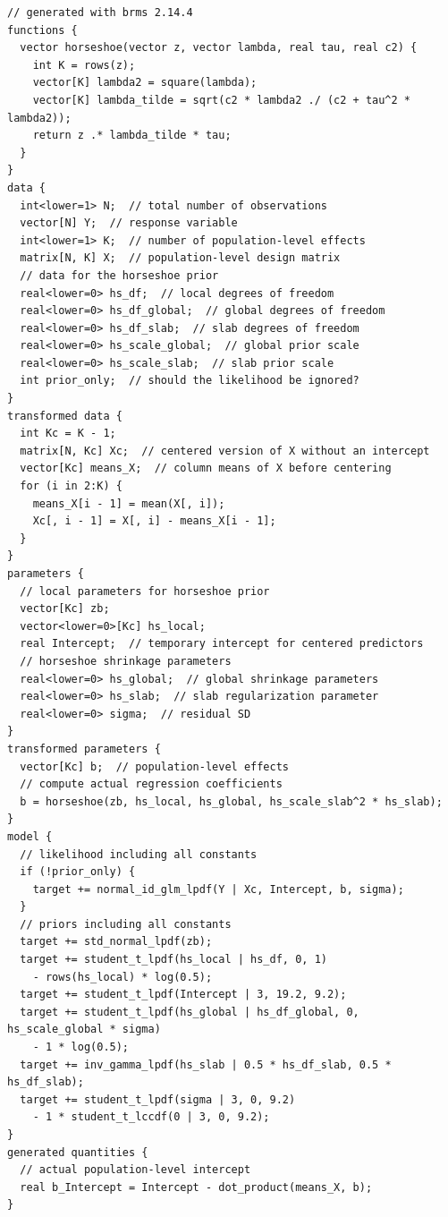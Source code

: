\documentclass[english,t]{beamer}
\begin{document}
\begin{frame}[fragile]
  {\tiny
\begin{lstlisting}
// generated with brms 2.14.4
functions {
  vector horseshoe(vector z, vector lambda, real tau, real c2) {
    int K = rows(z);
    vector[K] lambda2 = square(lambda);
    vector[K] lambda_tilde = sqrt(c2 * lambda2 ./ (c2 + tau^2 * lambda2));
    return z .* lambda_tilde * tau;
  }
}
data {
  int<lower=1> N;  // total number of observations
  vector[N] Y;  // response variable
  int<lower=1> K;  // number of population-level effects
  matrix[N, K] X;  // population-level design matrix
  // data for the horseshoe prior
  real<lower=0> hs_df;  // local degrees of freedom
  real<lower=0> hs_df_global;  // global degrees of freedom
  real<lower=0> hs_df_slab;  // slab degrees of freedom
  real<lower=0> hs_scale_global;  // global prior scale
  real<lower=0> hs_scale_slab;  // slab prior scale
  int prior_only;  // should the likelihood be ignored?
}
transformed data {
  int Kc = K - 1;
  matrix[N, Kc] Xc;  // centered version of X without an intercept
  vector[Kc] means_X;  // column means of X before centering
  for (i in 2:K) {
    means_X[i - 1] = mean(X[, i]);
    Xc[, i - 1] = X[, i] - means_X[i - 1];
  }
}
parameters {
  // local parameters for horseshoe prior
  vector[Kc] zb;
  vector<lower=0>[Kc] hs_local;
  real Intercept;  // temporary intercept for centered predictors
  // horseshoe shrinkage parameters
  real<lower=0> hs_global;  // global shrinkage parameters
  real<lower=0> hs_slab;  // slab regularization parameter
  real<lower=0> sigma;  // residual SD
}
transformed parameters {
  vector[Kc] b;  // population-level effects
  // compute actual regression coefficients
  b = horseshoe(zb, hs_local, hs_global, hs_scale_slab^2 * hs_slab);
}
model {
  // likelihood including all constants
  if (!prior_only) {
    target += normal_id_glm_lpdf(Y | Xc, Intercept, b, sigma);
  }
  // priors including all constants
  target += std_normal_lpdf(zb);
  target += student_t_lpdf(hs_local | hs_df, 0, 1)
    - rows(hs_local) * log(0.5);
  target += student_t_lpdf(Intercept | 3, 19.2, 9.2);
  target += student_t_lpdf(hs_global | hs_df_global, 0, hs_scale_global * sigma)
    - 1 * log(0.5);
  target += inv_gamma_lpdf(hs_slab | 0.5 * hs_df_slab, 0.5 * hs_df_slab);
  target += student_t_lpdf(sigma | 3, 0, 9.2)
    - 1 * student_t_lccdf(0 | 3, 0, 9.2);
}
generated quantities {
  // actual population-level intercept
  real b_Intercept = Intercept - dot_product(means_X, b);
}
\end{lstlisting}
  }


\end{frame}
\end{document}
